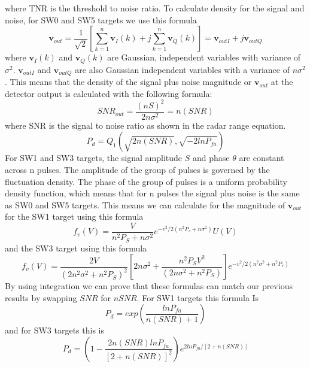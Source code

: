 \documentclass[12pt]{article}
\begin{document}
where TNR is the threshold to noise ratio. To calculate density for the signal and noise, for SW0 and SW5 targets we  use this formula
\begin{equation}
    \textbf{v}_{out} = \frac{1}{\sqrt{2}} \left[\sum_{k=1}^{n} \textbf{v}_I (k) + j \sum_{k=1}^{n} \textbf{v}_Q (k) \right] = \textbf{v}_{outI} + j \textbf{v}_{outQ}
\end{equation}
where $\textbf{v}_I(k)$ and $\textbf{v}_Q(k)$ are Gaussian, independent variables with variance of $\sigma^2$. $\textbf{v}_{outI}$ and $\textbf{v}_{outQ}$ are also Gaussian independent variables with a variance of $n\sigma^2$. This means that the density of the signal plus noise magnitude or $\textbf{v}_{out}$ at the detector output is calculated with the following formula:
\begin{equation}
    SNR_{out} = \frac{(nS)^2}{2n \sigma^2} = n(SNR)
\end{equation}
where SNR is the signal to noise ratio as shown in the radar range equation. 
\begin{equation}
    P_d = Q_1 ( \sqrt{2n(SNR)}, \sqrt{-2 ln P_{fa}})
\end{equation}
For SW1 and SW3 targets, the signal amplitude $S$ and phase $\theta$ are constant across n pulses. The amplitude of the group of pulses is governed by the fluctuation density. The phase of the group of pulses is a uniform probability density function, which means that for n pulses the signal plus noise is the same as SW0 and SW5 targets. This means we can calculate for the magnitude of $\textbf{v}_{out}$  for the SW1 target using this formula
\begin{equation}
    f_v (V) = \frac{V}{n^2 P_S + n \sigma^2} e ^{-v^2/2(n^2 P_s + n \sigma^2)} U(V)
\end{equation}
and the SW3 target using this formula
\begin{equation}
    f_v (V) = \frac{2V}{(2n^2 \sigma^2 + n^2 P_S)^2} \left[ 2n\sigma^2 + \frac{n^2 P_S V^2}{(2 n \sigma^2 + n^2 P_S)} \right] e ^{-v^2/2(n^2 \sigma^2 + n^2 P_s )} 
\end{equation}
By using integration we can prove that these formulas can match our previous results by swapping $SNR$ for $nSNR$. For SW1 targets this formula Is
\begin{equation}
    P_d = exp \left( \frac{ln P_{fa}}{n(SNR)+1} \right)
\end{equation}
and for SW3 targets this is 
\begin{equation}
    P_d = \left( 1 - \frac{2n (SNR) ln P_{fa}}{ \left[ 2 + n(SNR)\right] ^2} \right) e^{2 ln P_{fa} / \left[2 + n(SNR) \right]}
\end{equation}
\end{document}
